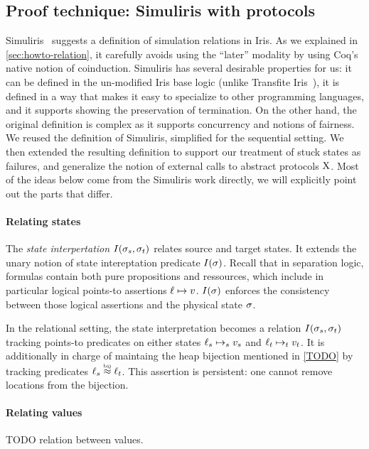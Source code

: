 \subsection{Proof technique: Simuliris with protocols}

Simuliris~\citep*{TODO-simuliris} suggests a definition of simulation relations in Iris. As we explained in \cref{sec:howto-relation}, it carefully avoids using the ``later'' modality by using Coq's native notion of coinduction. Simuliris has several desirable properties for us: it can be defined in the un-modified Iris base logic (unlike Transfite Iris~\citep*{transfinite-iris}), it is defined in a way that makes it easy to specialize to other programming languages, and it supports showing the preservation of termination. On the other hand, the original definition is complex as it supports concurrency and notions of fairness. We reused the definition of Simuliris, simplified for the sequential setting. We then extended the resulting definition to support our treatment of stuck states as failures, and generalize the notion of external calls to abstract protocols $\mathrm{X}$. Most of the ideas below come from the Simuliris work directly, we will explicitly point out the parts that differ.

\paragraph{Relating states} The \emph{state interpertation} $I(\datalangState_s, \datalangState_t)$ relates source and target states. It extends the unary notion of state intereptation predicate $I(\datalangState)$. Recall that in separation logic, formulas contain both pure propositions and ressources, which include in particular logical points-to assertions $\datalangLoc \iPointsto v$. $I(\datalangState)$ enforces the consistency between those logical assertions and the physical state $\datalangState$.

In the relational setting, the state interpretation becomes a relation $I(\datalangState_s, \datalangState_t)$ tracking points-to predicates on either states $\datalangLoc_s \iPointsto_s \datalangVal_s$ and $\datalangLoc_t \iPointsto_t \datalangVal_t$. It is additionally in charge of maintaing the heap bijection mentioned in \cref{TODO} by tracking predicates $\datalangLoc_s \iInBij \datalangLoc_t$. This assertion is persistent: one cannot remove locations from the bijection.

\paragraph{Relating values} TODO relation between values.

